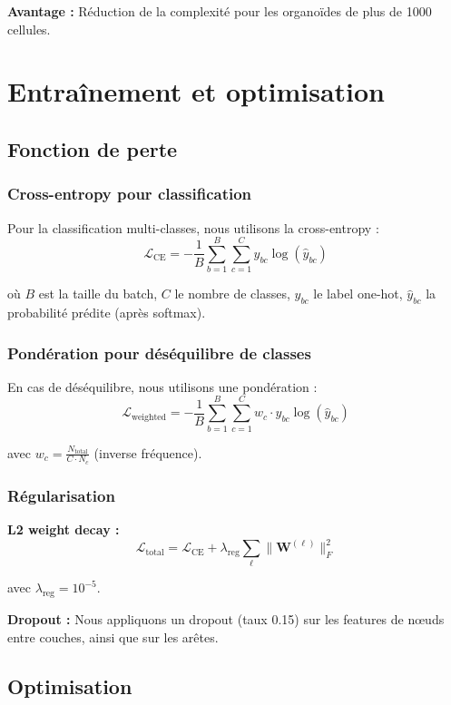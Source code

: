 \textbf{Avantage :} Réduction de la complexité pour les organoïdes de plus de 1000 cellules.

\section{Entraînement et optimisation}

\subsection{Fonction de perte}

\subsubsection{Cross-entropy pour classification}

Pour la classification multi-classes, nous utilisons la cross-entropy :
\[
\mathcal{L}_{\text{CE}} = -\frac{1}{B}\sum_{b=1}^B \sum_{c=1}^C y_{bc} \log(\hat{y}_{bc})
\]

où $B$ est la taille du batch, $C$ le nombre de classes, $y_{bc}$ le label one-hot, $\hat{y}_{bc}$ la probabilité prédite (après softmax).

\subsubsection{Pondération pour déséquilibre de classes}

En cas de déséquilibre, nous utilisons une pondération :
\[
\mathcal{L}_{\text{weighted}} = -\frac{1}{B}\sum_{b=1}^B \sum_{c=1}^C w_c \cdot y_{bc} \log(\hat{y}_{bc})
\]

avec $w_c = \frac{N_{\text{total}}}{C \cdot N_c}$ (inverse fréquence).

\subsubsection{Régularisation}

\textbf{L2 weight decay :}
\[
\mathcal{L}_{\text{total}} = \mathcal{L}_{\text{CE}} + \lambda_{\text{reg}} \sum_{\ell} \|\mathbf{W}^{(\ell)}\|_F^2
\]

avec $\lambda_{\text{reg}} = 10^{-5}$.

\textbf{Dropout :}
Nous appliquons un dropout (taux 0.15) sur les features de nœuds entre couches, ainsi que sur les arêtes.

\subsection{Optimisation}

